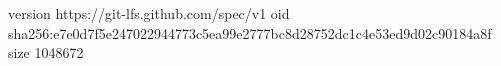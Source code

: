 version https://git-lfs.github.com/spec/v1
oid sha256:e7e0d7f5e247022944773c5ea99e2777bc8d28752dc1c4e53ed9d02c90184a8f
size 1048672
